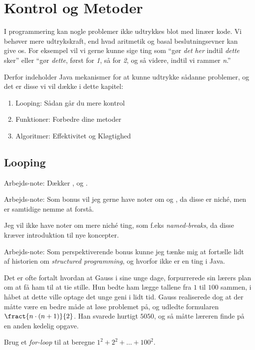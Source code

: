 \chapter{Kontrol og Metoder}

	I programmering kan nogle problemer ikke udtrykkes blot med linæer kode. Vi
	behøver mere udtrykskraft, end hvad aritmetik og basal beslutningsevner kan give
	os. For eksempel vil vi gerne kunne sige ting som ``gør \emph{det her} indtil
	\emph{dette} sker'' eller ``gør \emph{dette}, først for \emph{1}, så for
	\emph{2}, og så videre, indtil vi rammer \emph{n}.''

	Derfor indeholder Java mekanismer for at kunne udtrykke sådanne problemer, og
	det er disse vi vil dække i dette kapitel:

	\begin{enumerate}
		\item Looping: Sådan går du mere kontrol
		\item Funktioner: Forbedre dine metoder
		\item Algoritmer: Effektivitet og Kløgtighed
	\end{enumerate}

\section{Looping}

	\begin{remark}  Arbejds-note:
		Dækker ,  og .
	\end{remark}

	\begin{remark}  Arbejds-note:
		Som bonus vil jeg gerne have noter om  og
		, da disse er niché, men er samtidige nemme at
		forstå.

		Jeg vil ikke have noter om mere niché ting, som f.eks
		\emph{named-breaks}, da disse kræver introduktion til nye koncepter.
	\end{remark}

	\begin{remark}  Arbejds-note:
		Som perspektiverende bonus kunne jeg tænke mig at fortælle lidt af
		historien om \emph{structured programming}, og hvorfor 
		ikke er en ting i Java.
	\end{remark}

	\begin{exercise}
		Det er ofte fortalt hvordan at Gauss i sine unge dage, forpurrerede sin
		lærers plan om at få ham til at tie stille. Hun bedte ham lægge tallene
		fra \(1\) til \(100\) sammen, i håbet at dette ville optage det unge
		geni i lidt tid. Gauss realiserede dog at der måtte være en bedre måde
		at løse problemet på, og udledte formularen \(\fract{n\cdot(n+1)}{2}\).
		Han svarede hurtigt \(5050\), og så måtte læreren finde på en anden
		kedelig opgave.

		Brug et \emph{for-loop} til at beregne \(1^2+2^2+\dots+100^2\).
	\end{exercise}

